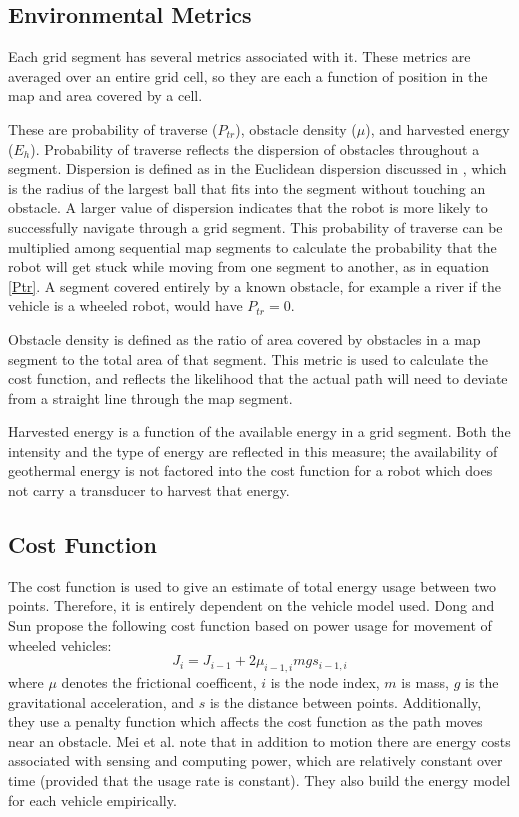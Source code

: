 \documentclass[journal]{IEEEtran}
\begin{document}
\subsection{Environmental Metrics}
Each grid segment has several metrics associated with it. These metrics are averaged over an entire grid cell, so they are each a function of position in the map and area covered by a cell.

These are probability of traverse ($P_{tr}$), obstacle density ($\mu$), and harvested energy ($E_h$). Probability of traverse reflects the dispersion of obstacles throughout a segment. 
Dispersion is defined as in the Euclidean dispersion discussed in \cite{lavalle2004relationship}, which is the radius of the largest ball that fits into the segment without touching an obstacle. 
A larger value of dispersion indicates that the robot is more likely to successfully navigate through a grid segment.
This probability of traverse can be multiplied among sequential map segments to calculate the probability that the robot will get stuck while moving from one segment to another, as in equation \ref{Ptr}. 
A segment covered entirely by a known obstacle, for example a river if the vehicle is a wheeled robot, would have $P_{tr} = 0$. 

Obstacle density is defined as the ratio of area covered by obstacles in a map segment to the total area of that segment. 
This metric is used to calculate the cost function, and reflects the likelihood that the actual path will need to deviate from a straight line through the map segment. 

Harvested energy is a function of the available energy in a grid segment. Both the intensity and the type of energy are reflected in this measure; the availability of geothermal energy is not factored into the cost function for a robot which does not carry a transducer to harvest that energy.
 
\subsection{Cost Function}
The cost function is used to give an estimate of total energy usage between two points. 
Therefore, it is entirely dependent on the vehicle model used. Dong and Sun \cite{minimizing energy consumption of wheeled mobile robots ...} propose the following cost function based on power usage for movement of wheeled vehicles:
\begin{equation}
J_i = J_{i-1} + 2\mu_{i-1,i}mg s_{i-1,i}
\end{equation}
where $\mu$ denotes the frictional coefficent, $i$ is the node index, $m$ is mass, $g$ is the gravitational acceleration, and $s$ is the distance between points. 
Additionally, they use a penalty function which affects the cost function as the path moves near an obstacle.
Mei et al. \cite{Mei - deployment} note that in addition to motion there are energy costs associated with sensing and computing power, which are relatively constant over time (provided that the usage rate is constant).
They also build the energy model for each vehicle empirically.
\end{document}
